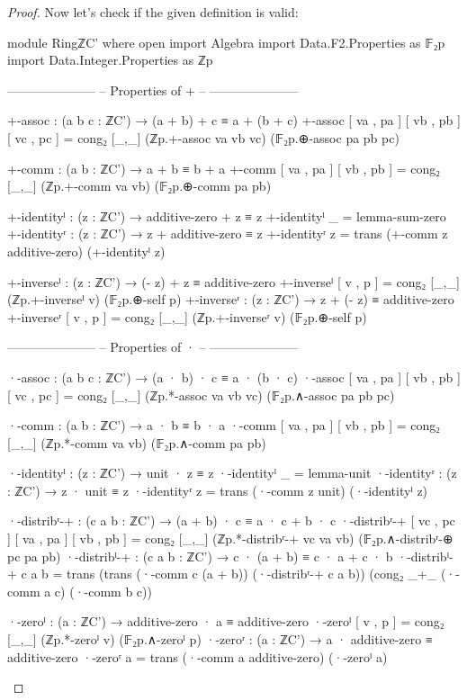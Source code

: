 \documentclass[a4paper]{report}
\theoremstyle{definition}
\begin{document}
\begin{proof}
  Now let's check if the given definition is valid:
  \begin{code}
module RingℤC' where
  open import Algebra
  import Data.F2.Properties as 𝔽₂p
  import Data.Integer.Properties as ℤp

  ---------------------
  -- Properties of + --
  ---------------------

  +-assoc : (a b c : ℤC') → (a + b) + c ≡ a + (b + c)
  +-assoc [ va , pa ] [ vb , pb ] [ vc , pc ] = cong₂ [_,_] (ℤp.+-assoc va vb vc) (𝔽₂p.⊕-assoc pa pb pc)

  +-comm : (a b : ℤC') → a + b ≡ b + a
  +-comm [ va , pa ] [ vb , pb ] = cong₂ [_,_] (ℤp.+-comm va vb) (𝔽₂p.⊕-comm pa pb)

  +-identityˡ : (z : ℤC') → additive-zero + z ≡ z
  +-identityˡ _ = lemma-sum-zero
  +-identityʳ : (z : ℤC') → z + additive-zero ≡ z
  +-identityʳ z = trans (+-comm z additive-zero) (+-identityˡ z)

  +-inverseˡ : (z : ℤC') → (- z) + z ≡ additive-zero
  +-inverseˡ [ v , p ] = cong₂ [_,_] (ℤp.+-inverseˡ v) (𝔽₂p.⊕-self p)
  +-inverseʳ : (z : ℤC') → z + (- z) ≡ additive-zero
  +-inverseʳ [ v , p ] = cong₂ [_,_] (ℤp.+-inverseʳ v) (𝔽₂p.⊕-self p)

  ---------------------
  -- Properties of · --
  ---------------------

  ·-assoc : (a b c : ℤC') → (a · b) · c ≡ a · (b · c)
  ·-assoc [ va , pa ] [ vb , pb ] [ vc , pc ] = cong₂ [_,_] (ℤp.*-assoc va vb vc) (𝔽₂p.∧-assoc pa pb pc)

  ·-comm : (a b : ℤC') → a · b ≡ b · a
  ·-comm [ va , pa ] [ vb , pb ] = cong₂ [_,_] (ℤp.*-comm va vb) (𝔽₂p.∧-comm pa pb)

  ·-identityˡ : (z : ℤC') → unit · z ≡ z
  ·-identityˡ _ = lemma-unit
  ·-identityʳ : (z : ℤC') → z · unit ≡ z
  ·-identityʳ z = trans (·-comm z unit) (·-identityˡ z)

  ·-distribʳ-+ : (c a b : ℤC') → (a + b) · c ≡ a · c + b · c
  ·-distribʳ-+ [ vc , pc ] [ va , pa ] [ vb , pb ] = cong₂ [_,_] (ℤp.*-distribʳ-+ vc va vb) (𝔽₂p.∧-distribʳ-⊕ pc pa pb)
  ·-distribˡ-+ : (c a b : ℤC') → c · (a + b) ≡ c · a + c · b
  ·-distribˡ-+ c a b = trans (trans (·-comm c (a + b)) (·-distribʳ-+ c a b)) (cong₂ _+_  (·-comm a c) (·-comm b c))

  ·-zeroˡ : (a : ℤC') → additive-zero · a ≡ additive-zero
  ·-zeroˡ [ v , p ] = cong₂ [_,_] (ℤp.*-zeroˡ v)  (𝔽₂p.∧-zeroˡ p)
  ·-zeroʳ : (a : ℤC') → a · additive-zero ≡ additive-zero
  ·-zeroʳ a = trans (·-comm a additive-zero) (·-zeroˡ a)


\end{code}
\end{proof}
\end{document}
